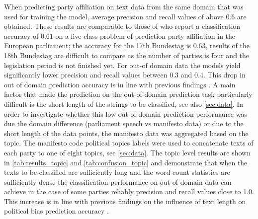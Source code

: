 \documentclass[runningheads,a4paper]{llncs}
\begin{document}
When predicting party affiliation on text data from the same domain that was used for training the model, average precision and recall values of above 0.6 are obtained. These results are comparable to those of \cite{Hirst2014} who report a classification accuracy of 0.61 on a five class problem of prediction party affiliation in the European parliament; the accuracy for the 17th Bundestag is 0.63, results of the 18th Bundestag are difficult to compare as the number of parties is four and the legislation period is not finished yet.
For out-of domain data the models yield significantly lower precision and recall values between 0.3 and 0.4.  This drop in out of domain prediction accuracy is in line with previous findings \cite{Yu2008}.
A main factor that made the prediction on the out-of-domain prediction task particularly difficult is the short length of the strings to be classified, see also \autoref{sec:data}. In order to investigate whether this low out-of-domain prediction performance was due the domain difference (parliament speech vs manifesto data) or due to the short length of the data points, the manifesto data was aggregated based on the topic. The manifesto code political topics labels were used to concatenate texts of each party to one of eight topics, see \autoref{sec:data}. The topic level results are shown in \autoref{tab:results_topic} and \autoref{tab:confusion_topic} and demonstrate that when the texts to be classified are sufficiently long and the word count statistics are sufficiently dense the classification performance on out of domain data can achieve in the case of some parties reliably precision and recall values close to 1.0. This increase is in line with previous findings on the influence of text length on political bias prediction accuracy \cite{Hirst2014}.
\end{document}
